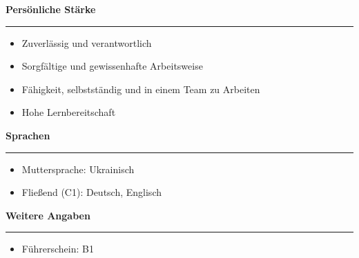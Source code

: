 \documentclass[12pt]{article} %
\newcommand{\HighlightedText}[1] {{\textbf{#1}}}
\newenvironment{ItemizeSection}[1]{
    \vspace{1mm}
    \HighlightedText{#1}
    \vspace{0.5mm}
    {\color{custom_blue} \hrule}
    \begin{itemize}[left=0.5em, topsep=0pt, itemsep=0pt, label={$\bullet$}]
}{
    \end{itemize}
}
\begin{document}
\begin{ItemizeSection}{Persönliche Stärke}
    \item Zuverlässig und verantwortlich
    \item Sorgfältige und gewissenhafte Arbeitsweise
    \item Fähigkeit, selbstständig und in einem Team zu Arbeiten
    \item Hohe Lernbereitschaft
\end{ItemizeSection}

\begin{ItemizeSection}{Sprachen}
    \item Muttersprache: Ukrainisch
    \item Fließend (C1): Deutsch, Englisch
\end{ItemizeSection}

\begin{ItemizeSection}{Weitere Angaben}
    \item Führerschein: B1
\end{ItemizeSection}
\end{document}
